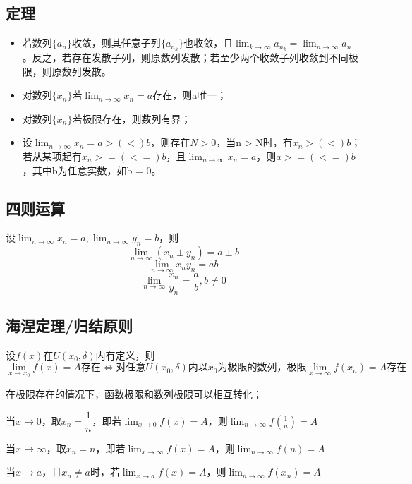 \subsection{定理}
\begin{itemize}
    \item 若数列\(\{a_n\}\)收敛，则其任意子列\(\{a_{n_k}\}\)也收敛，且\(\displaystyle \lim_{k \to \infty}a_{n_k} = \lim_{n \to \infty}a_n\)。反之，若存在发散子列，则原数列发散；若至少两个收敛子列收敛到不同极限，则原数列发散。
    \item 对数列\(\{x_n\}\)若\(\displaystyle \lim_{n \to \infty}x_n = a\)存在，则a唯一；
    \item 对数列\(\{x_n\}\)若极限存在，则数列有界；
    \item 设\(\displaystyle \lim_{n \to \infty}x_n = a >(<) b\)，则存在\(N > 0\)，当n > N时，有\(x_n >(<) b\)；若从某项起有\(x_n >=(<=) b\)，且\(\lim_{n \to \infty}x_n = a\)，则\(a >=(<=) b\)，其中b为任意实数，如b = 0。
\end{itemize}


\subsection{四则运算}
设\(\displaystyle \lim_{n \to \infty}x_n = a, \lim_{n \to \infty}y_n = b\)，则
\[\lim_{n \to \infty}(x_n \pm y_n) = a \pm b\]
\[\lim_{n \to \infty}x_ny_n = ab\]
\[\lim_{n \to \infty}\dfrac{x_n}{y_n} = \dfrac{a}{b},b \neq 0\]


\subsection{海涅定理/归结原则}
设\(f(x)\)在\(U(x_0, \delta)\)内有定义，则
\[\displaystyle \lim_{x \to x_0}f(x) = A\text{存在} \Leftrightarrow \text{对任意}U(x_0, \delta)\text{内以}x_0\text{为极限的数列，极限}\lim_{x \to \infty}f(x_n) = A\text{存在}\]

在极限存在的情况下，函数极限和数列极限可以相互转化；

当\(x \to 0\)，取\(x_n = \dfrac{1}{n}\)，即若\(\displaystyle \lim_{x \to 0}f(x) = A\)，则\(\displaystyle \lim_{n \to \infty}f(\frac{1}{n}) = A\)

当\(x \to \infty\)，取\(x_n = n\)，即若\(\displaystyle \lim_{x \to \infty}f(x) = A\)，则\(\displaystyle \lim_{n \to \infty}f(n) = A\)

当\(x \to a\)，且\(x_n \neq a\)时，若\(\displaystyle \lim_{x \to a}f(x) = A\)，则\(\displaystyle \lim_{n \to \infty}f(x_n) = A\)

